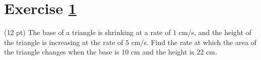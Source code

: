




%
%
%
%


\newpage

\section{Exercise \ref{sec : Math112 Spring2022 MockExam1 Q6}}
\label{sec : Math112 Spring2022 MockExam1 Q6}

(12 pt) The base of a triangle is shrinking at a rate of $1$ cm/s, and the height of the triangle is increasing at the rate of $5$ cm/s. Find the rate at which the area of the triangle changes when the base is $10$ cm and the height is $22$ cm.

